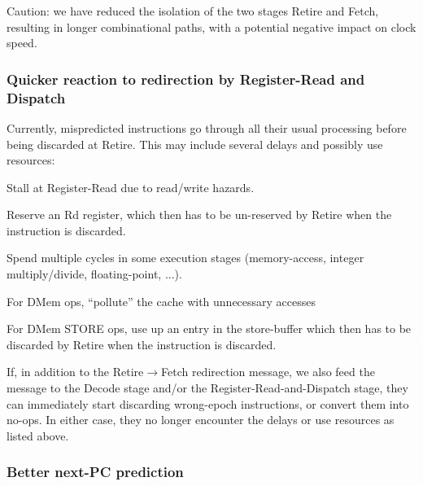 Caution: we have reduced the isolation of the two stages Retire and
Fetch, resulting in longer combinational paths, with a potential
negative impact on clock speed.


\subsubsection{Quicker reaction to redirection by Register-Read and Dispatch}

Currently, mispredicted instructions go through all their usual
processing before being discarded at Retire.  This may include several
delays and possibly use resources:

\begin{tightlist}
 \item Stall at Register-Read due to read/write hazards.

 \item Reserve an Rd register, which then has to be un-reserved by
       Retire when the instruction is discarded.

 \item Spend multiple cycles in some execution stages (memory-access,
       integer multiply/divide, floating-point, ...).

 \item For DMem ops, ``pollute'' the cache with unnecessary accesses 

 \item For DMem STORE ops, use up an entry in the store-buffer which
       then has to be discarded by Retire when the instruction is
       discarded.

\end{tightlist}

If, in addition to the Retire$\longrightarrow$Fetch redirection
message, we also feed the message to the Decode stage and/or the
Register-Read-and-Dispatch stage, they can immediately start
discarding wrong-epoch instructions, or convert them into no-ops.  In
either case, they no longer encounter the delays or use resources as
listed above.


\subsubsection{Better next-PC prediction}

